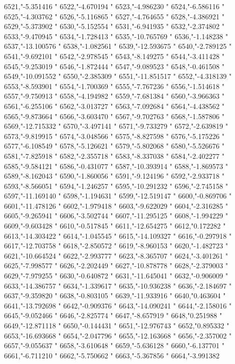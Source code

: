 6521,"-5.351416
"
6522,"-4.670194
"
6523,"-4.986230
"
6524,"-6.586116
"
6525,"-4.303762
"
6526,"-5.116865
"
6527,"-4.764655
"
6528,"-4.386921
"
6529,"-5.373902
"
6530,"-5.152554
"
6531,"-6.941935
"
6532,"-2.374802
"
6533,"-9.470945
"
6534,"-1.728413
"
6535,"-10.765769
"
6536,"-1.148238
"
6537,"-13.100576
"
6538,"-1.082561
"
6539,"-12.593675
"
6540,"-2.789125
"
6541,"-9.692101
"
6542,"-2.978545
"
6543,"-8.149275
"
6544,"-3.411428
"
6545,"-9.253019
"
6546,"-1.872444
"
6547,"-9.089523
"
6548,"-0.461508
"
6549,"-10.091552
"
6550,"-2.385309
"
6551,"-11.851517
"
6552,"-4.318139
"
6553,"-8.593901
"
6554,"-1.700369
"
6555,"-7.767236
"
6556,"-1.514618
"
6557,"-9.750913
"
6558,"-4.194982
"
6559,"-7.681384
"
6560,"-3.966363
"
6561,"-6.255106
"
6562,"-3.013727
"
6563,"-7.092684
"
6564,"-4.438562
"
6565,"-9.873664
"
6566,"-3.603470
"
6567,"-9.702763
"
6568,"-1.587806
"
6569,"-12.715332
"
6570,"-3.497141
"
6571,"-9.733279
"
6572,"-2.639819
"
6573,"-9.819915
"
6574,"-3.048566
"
6575,"-8.827598
"
6576,"-5.175226
"
6577,"-6.108549
"
6578,"-5.126621
"
6579,"-5.802068
"
6580,"-5.526676
"
6581,"-7.825918
"
6582,"-2.355718
"
6583,"-8.337038
"
6584,"-2.402277
"
6585,"-9.584121
"
6586,"-0.431077
"
6587,"-10.393914
"
6588,"-1.869573
"
6589,"-8.162043
"
6590,"-1.860056
"
6591,"-9.124196
"
6592,"-2.933718
"
6593,"-8.566051
"
6594,"-1.246257
"
6595,"-10.291232
"
6596,"-2.745158
"
6597,"-11.169140
"
6598,"-1.194631
"
6599,"-12.519147
"
6600,"-0.869706
"
6601,"-11.478126
"
6602,"-1.979418
"
6603,"-9.622029
"
6604,"-2.316285
"
6605,"-9.265941
"
6606,"-3.502744
"
6607,"-11.295125
"
6608,"-1.994229
"
6609,"-9.603428
"
6610,"-0.517845
"
6611,"-12.654275
"
6612,"0.172282
"
6613,"-14.303422
"
6614,"-1.045545
"
6615,"-14.109327
"
6616,"-0.297918
"
6617,"-12.703758
"
6618,"-2.850572
"
6619,"-8.960153
"
6620,"-1.482723
"
6621,"-10.664524
"
6622,"-2.993777
"
6623,"-8.365707
"
6624,"-3.401261
"
6625,"-7.998577
"
6626,"-2.202449
"
6627,"-10.878778
"
6628,"-2.379003
"
6629,"-7.979255
"
6630,"-0.640872
"
6631,"-11.645041
"
6632,"-0.906009
"
6633,"-14.386757
"
6634,"-1.339617
"
6635,"-10.936238
"
6636,"-2.184697
"
6637,"-9.359820
"
6638,"-0.803105
"
6639,"-11.933916
"
6640,"0.463604
"
6641,"-13.792698
"
6642,"-0.909376
"
6643,"-14.090241
"
6644,"-2.158016
"
6645,"-9.052466
"
6646,"-2.825774
"
6647,"-8.657919
"
6648,"0.251988
"
6649,"-12.871118
"
6650,"-0.144431
"
6651,"-12.976743
"
6652,"0.895332
"
6653,"-16.693668
"
6654,"-2.047796
"
6655,"-12.163668
"
6656,"-2.357002
"
6657,"-9.055637
"
6658,"-3.610648
"
6659,"-5.636128
"
6660,"-6.137701
"
6661,"-6.711210
"
6662,"-5.750662
"
6663,"-5.367856
"
6664,"-3.991382
